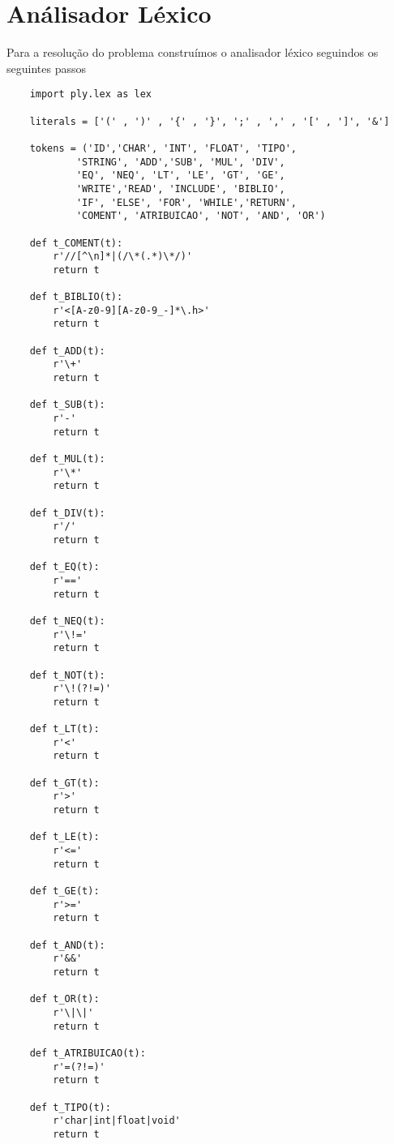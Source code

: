 \documentclass[12pt,a4paper]{report}
\begin{document}
\chapter{An\'{a}lisador L\'{e}xico}
Para a resolução do problema construímos o analisador léxico seguindos os seguintes passos

\begin{lstlisting}
    import ply.lex as lex

    literals = ['(' , ')' , '{' , '}', ';' , ',' , '[' , ']', '&']

    tokens = ('ID','CHAR', 'INT', 'FLOAT', 'TIPO',
            'STRING', 'ADD','SUB', 'MUL', 'DIV',
            'EQ', 'NEQ', 'LT', 'LE', 'GT', 'GE',
            'WRITE','READ', 'INCLUDE', 'BIBLIO',
            'IF', 'ELSE', 'FOR', 'WHILE','RETURN',
            'COMENT', 'ATRIBUICAO', 'NOT', 'AND', 'OR')
    
    def t_COMENT(t):
        r'//[^\n]*|(/\*(.*)\*/)'
        return t
        
    def t_BIBLIO(t):
        r'<[A-z0-9][A-z0-9_-]*\.h>'
        return t
        
    def t_ADD(t):
        r'\+'
        return t
        
    def t_SUB(t):
        r'-'
        return t
        
    def t_MUL(t):
        r'\*'
        return t
        
    def t_DIV(t):
        r'/'
        return t
        
    def t_EQ(t):
        r'=='
        return t
        
    def t_NEQ(t):
        r'\!='
        return t
        
    def t_NOT(t):
        r'\!(?!=)'
        return t
        
    def t_LT(t):
        r'<'
        return t
        
    def t_GT(t):
        r'>'
        return t
        
    def t_LE(t):
        r'<='
        return t
        
    def t_GE(t):
        r'>='
        return t
        
    def t_AND(t):
        r'&&'
        return t
        
    def t_OR(t):
        r'\|\|'
        return t
        
    def t_ATRIBUICAO(t):
        r'=(?!=)'
        return t
        
    def t_TIPO(t):
        r'char|int|float|void'
        return t
        

\end{lstlisting}
\end{document}
